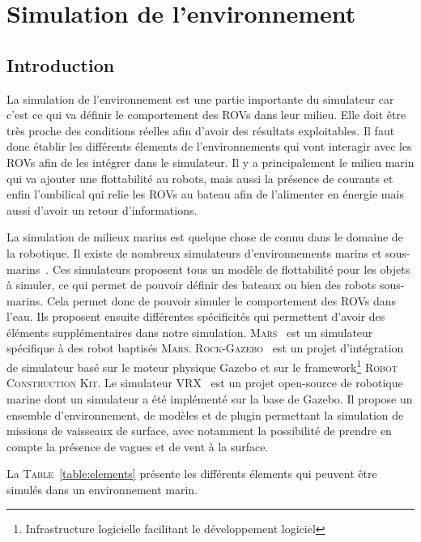 \chapter{Simulation de l'environnement}
\label{chapitre:environnement}
	
	\section{Introduction}

		La simulation de l'environnement est une partie importante du simulateur car c'est ce qui va définir le comportement des \gls{ROV}s dans leur milieu. Elle doit être très proche des conditions réelles afin d'avoir des résultats exploitables. Il faut donc établir les différents élements de l'environnements qui vont interagir avec les \gls{ROV}s afin de les intégrer dans le simulateur. Il y a principalement le milieu marin qui va ajouter une flottabilité au robots, mais aussi la présence de courants et enfin l'ombilical qui relie les \gls{ROV}s au bateau afin de l'alimenter en énergie mais aussi d'avoir un retour d'informations.

		La simulation de milieux marins est quelque chose de connu dans le domaine de la robotique. Il existe de nombreux simulateurs d'environnements marins et sous-marins~\cite{Manhaes_2016, bingham19toward, MARS, Rock}. Ces simulateurs proposent tous un modèle de flottabilité pour les objets à simuler, ce qui permet de pouvoir définir des bateaux ou bien des robots sous-marins. Cela permet donc de pouvoir simuler le comportement des \gls{ROV}s dans l'eau. Ils proposent ensuite différentes spécificités qui permettent d'avoir des éléments supplémentaires dans notre simulation. \textsc{Mars}~\cite{MARS} est un simulateur spécifique à des robot baptisés \textsc{Mars}. \textsc{Rock-Gazebo}~\cite{Rock} est un projet d'intégration de simulateur basé sur le moteur physique \gls{Gazebo} et sur le framework\footnote{Infrastructure logicielle facilitant le développement logiciel} \textsc{Robot Construction Kit}. Le simulateur \textsc{VRX}~\cite{bingham19toward} est un projet open-source de robotique marine dont un simulateur a été implémenté sur la base de \gls{Gazebo}. Il propose un ensemble d'environnement, de modèles et de plugin permettant la simulation de missions de vaisseaux de surface, avec notamment la possibilité de prendre en compte la présence de vagues et de vent à la surface.

		La \textsc{Table}~\ref{table:elements} présente les différents élements qui peuvent être simulés dans un environnement marin.

